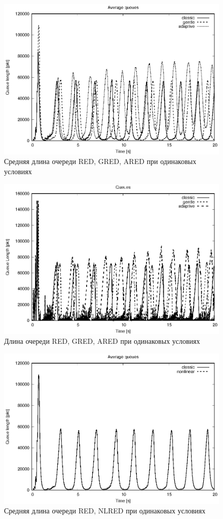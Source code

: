 \begin{figure}[!ht]
  \centering
  \includegraphics[width=0.6\linewidth]{image/av_queues_3types.eps}
  \caption{Средняя длина очереди RED, GRED, ARED при одинаковых условиях}
  \label{fig:3.4}
\end{figure}

\begin{figure}[!ht]
  \centering
  \includegraphics[width=0.6\linewidth]{image/queues_3types.eps}
  \caption{Длина очереди RED, GRED, ARED при одинаковых условиях}
  \label{fig:3.5}
\end{figure}

\begin{figure}[!ht]
  \centering
  \includegraphics[width=0.6\linewidth]{image/av_queues_classic_nonlinear.eps}
  \caption{Средняя длина очереди RED, NLRED при одинаковых условиях}
  \label{fig:3.6}
\end{figure}

